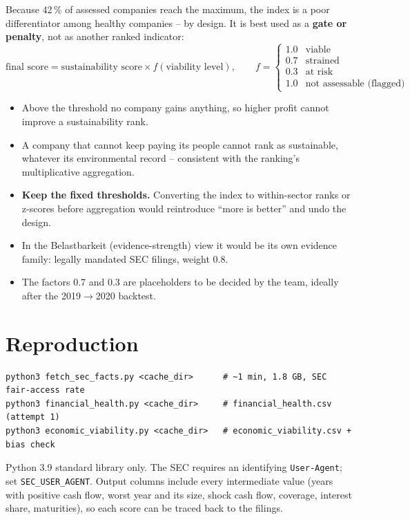 \documentclass[11pt,a4paper]{article}
\newcommand{\code}[1]{\texttt{\small #1}}
\begin{document}
Because 42\,\% of assessed companies reach the maximum, the index is a poor differentiator among healthy companies -- by design. It is best used as a \textbf{gate or penalty}, not as another ranked indicator:
\[
\text{final score} = \text{sustainability score} \times f(\text{viability level}),\qquad
f = \begin{cases} 1.0 & \text{viable} \\ 0.7 & \text{strained} \\ 0.3 & \text{at risk} \\ 1.0 & \text{not assessable (flagged)} \end{cases}
\]
\begin{itemize}
  \item Above the threshold no company gains anything, so higher profit cannot improve a sustainability rank.
  \item A company that cannot keep paying its people cannot rank as sustainable, whatever its environmental record -- consistent with the ranking's multiplicative aggregation.
  \item \textbf{Keep the fixed thresholds.} Converting the index to within-sector ranks or z-scores before aggregation would reintroduce ``more is better'' and undo the design.
  \item In the Belastbarkeit (evidence-strength) view it would be its own evidence family: legally mandated SEC filings, weight 0.8.
  \item The factors 0.7 and 0.3 are placeholders to be decided by the team, ideally after the 2019$\rightarrow$2020 backtest.
\end{itemize}

\section{Reproduction}
\begin{verbatim}
python3 fetch_sec_facts.py <cache_dir>      # ~1 min, 1.8 GB, SEC fair-access rate
python3 financial_health.py <cache_dir>     # financial_health.csv (attempt 1)
python3 economic_viability.py <cache_dir>   # economic_viability.csv + bias check
\end{verbatim}
Python 3.9 standard library only. The SEC requires an identifying \code{User-Agent}; set \code{SEC\_USER\_AGENT}. Output columns include every intermediate value (years with positive cash flow, worst year and its size, shock cash flow, coverage, interest share, maturities), so each score can be traced back to the filings.
\end{document}

